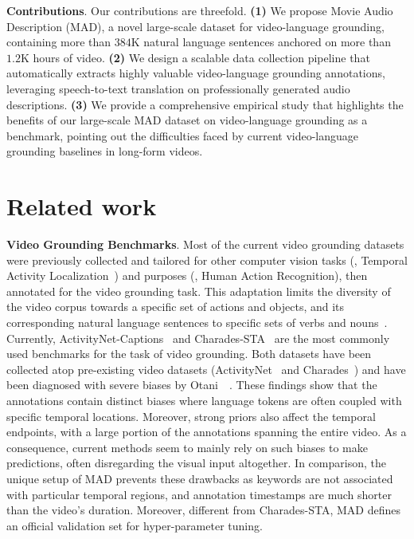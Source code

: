 \documentclass[10pt,twocolumn,letterpaper]{article}
\renewcommand{\paragraph}[1]{\vspace{1mm}\noindent\textbf{#1}.}
\begin{document}
\paragraph{Contributions} Our contributions are threefold.
\textbf{(1)} We propose Movie Audio Description (MAD), a novel large-scale dataset for video-language grounding, containing more than $384$K natural language sentences anchored on more than $1.2$K hours of video. 
\textbf{(2)} We design a scalable data collection pipeline that automatically extracts highly valuable video-language grounding annotations, leveraging speech-to-text translation on professionally generated audio descriptions.
\textbf{(3)} We provide a comprehensive empirical study that highlights the benefits of our large-scale MAD dataset on video-language grounding as a benchmark, pointing out the difficulties faced by current video-language grounding baselines in long-form videos. 
 \section{Related work}\label{sec: related}

\paragraph{Video Grounding Benchmarks}
Most of the current video grounding datasets were previously collected and tailored for other computer vision tasks (\ie, Temporal Activity Localization~\cite{7298698, TACoS_ACL_2013}) and purposes (\ie, Human Action Recognition), then annotated for the video grounding task. This adaptation limits the diversity of the video corpus towards a specific set of actions and objects, and its corresponding natural language sentences to specific sets of verbs and nouns~\cite{rohrbach2014coherent, Krishna_2017_ICCV, Gao_2017_ICCV, otani2020challengesmr}. Currently, ActivityNet-Captions~\cite{Krishna_2017_ICCV} and Charades-STA~\cite{Gao_2017_ICCV} are the most commonly used benchmarks for the task of video grounding. Both datasets have been collected atop pre-existing video datasets (ActivityNet~\cite{7298698} and Charades~\cite{10.1007/978-3-319-46448-0_31}) and have been diagnosed with severe biases by Otani~\etal~\cite{otani2020challengesmr}. These findings show that the annotations contain distinct biases where language tokens are often coupled with specific temporal locations. Moreover, strong priors also affect the temporal endpoints, with a large portion of the annotations spanning the entire video. As a consequence, current methods seem to mainly rely on such biases to make predictions, often disregarding the visual input altogether. In comparison, the unique setup of MAD prevents these drawbacks as keywords are not associated with particular temporal regions, and annotation timestamps are much shorter than the video's duration.  Moreover, different from Charades-STA, MAD defines an official validation set for hyper-parameter tuning. 
\end{document}

